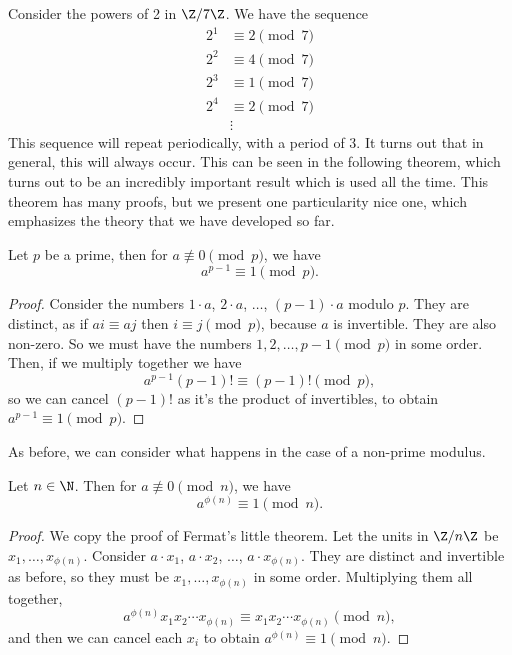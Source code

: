 Consider the powers of 2 in $\Z/7\Z$. We have the sequence
\begin{align*}
	2^1 &\equiv 2 \pmod{7}\\
	2^2 &\equiv 4 \pmod{7}\\
	2^3 &\equiv 1 \pmod{7}\\
	2^4 &\equiv 2 \pmod{7}\\
		&\vdots
\end{align*}
This sequence will repeat periodically, with a period of 3.
It turns out that in general, this will always occur. This can be seen in the following theorem, which turns out to be an incredibly important result which is used all the time. This theorem has many proofs, but we present one particularity nice one, which emphasizes the theory that we have developed so far.

\begin{theorem}
	Let $p$ be a prime, then for $a \not\equiv 0 \pmod{p}$, we have 
	$$a^{p - 1} \equiv 1 \pmod{p}.$$
\end{theorem}
\begin{proof}
	Consider the numbers $1 \cdot a$, $2 \cdot a$, $\dots$, $(p - 1) \cdot a$ modulo $p$. They are distinct, as if $a i \equiv aj$ then $i \equiv j \pmod{p}$, because $a$ is invertible. They are also non-zero. So we must have the numbers $1, 2, \dots, p - 1 \pmod{p}$ in some order. Then, if we multiply together we have
	$$
	a^{p - 1} (p - 1)! \equiv (p - 1)! \pmod{p},
	$$
	so we can cancel $(p - 1)!$ as it's the product of invertibles, to obtain $a^{p - 1} \equiv 1 \pmod{p}$.
\end{proof}

As before, we can consider what happens in the case of a non-prime modulus.

\begin{theorem}
	Let $n \in \N$. Then for $a \not \equiv 0 \pmod{n}$, we have
	$$
	a^{\phi(n)} \equiv 1 \pmod{n}.
	$$
\end{theorem}
\begin{proof}
	We copy the proof of Fermat's little theorem. Let the units in $\Z/n\Z$ be $x_1, \dots, x_{\phi(n)}$. Consider $a \cdot x_1$, $a \cdot x_2$, $\dots$, $a \cdot x_{\phi(n)}$. They are distinct and invertible as before, so they must be $x_1, \dots, x_{\phi(n)}$ in some order. Multiplying them all together,
	$$
	a^{\phi(n)} x_1 x_2 \cdots x_{\phi(n)} \equiv x_1 x_2 \cdots x_{\phi(n)} \pmod{n},
	$$
	and then we can cancel each $x_i$ to obtain $a^{\phi(n)} \equiv 1 \pmod{n}$.
\end{proof}


